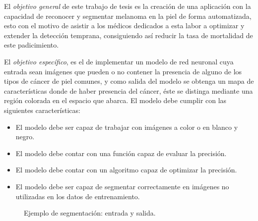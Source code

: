 El \emph{objetivo general} de este trabajo de tesis es la creación de una aplicación con la capacidad de reconocer y segmentar melanoma en la piel de forma automatizada, esto con el motivo de asistir a los médicos dedicados a esta labor a optimizar y extender la detección temprana, consiguiendo así reducir la tasa de mortalidad de este padicimiento.

El \emph{objetivo específico}, es el de implementar un modelo de red neuronal cuya entrada sean imágenes que pueden o no contener la presencia de alguno de los tipos de cáncer de piel comunes, y como salida del modelo se obtenga un mapa de características donde de haber presencia del cáncer, éste se distinga mediante una región colorada en el espacio que abarca. El modelo debe cumplir con las siguientes características:

\begin{itemize}
    \item El modelo debe ser capaz de trabajar con imágenes a color o en blanco y negro.
    \item El modelo debe contar con una función capaz de evaluar la precisión.
    \item El modelo debe contar con un algoritmo capaz de optimizar la precisión.
    \item El modelo debe ser capaz de segmentar correctamente en imágenes no utilizadas en los datos de entrenamiento.
\end{itemize}

\begin{figure}[!htp]
    \centering
    \qquad
    \caption{Ejemplo de segmentación: entrada y salida.}
    \label{data_1}
\end{figure}

